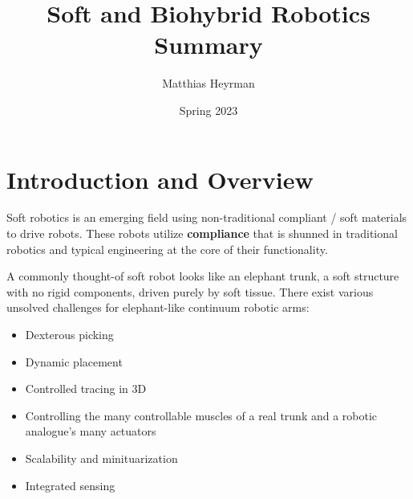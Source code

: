 \documentclass[onecolumn,a4paper]{article}
\begin{document}
\title{Soft and Biohybrid Robotics Summary}
\author{Matthias Heyrman}
\date{Spring 2023}
\maketitle

\section{Introduction and Overview}
Soft robotics is an emerging field using non-traditional compliant / soft materials to drive robots. These robots utilize \textbf{compliance} that is shunned in traditional robotics and typical engineering at the core of their functionality.

A commonly thought-of soft robot looks like an elephant trunk, a soft structure with no rigid components, driven purely by soft tissue.
There exist various unsolved challenges for elephant-like continuum robotic arms:
\begin{itemize}
    \item Dexterous picking
    \item Dynamic placement
    \item Controlled tracing in 3D
    \item Controlling the many controllable muscles of a real trunk and a robotic analogue's many actuators
    \item Scalability and minituarization
    \item Integrated sensing
\end{itemize}
\end{document}
